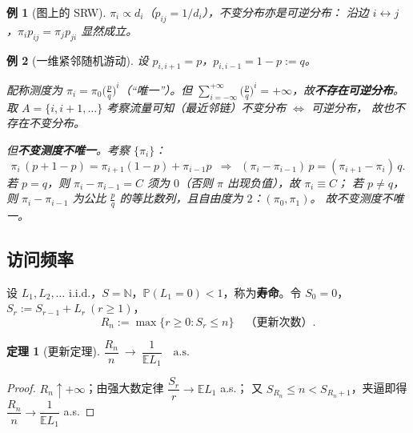 \documentclass[lang=cn,10pt,newtx,thmcnt=chapter,mode=simple]{vividbook}
\providecommand{\N}{}\renewcommand{\N}{\mathbb{N}}
\providecommand{\E}{}\renewcommand{\E}{\mathbb{E}}
\providecommand{\Pp}{}\renewcommand{\Pp}{\mathbb{P}}
\newcommand{\darr}{\;\Rightarrow\;}
\theoremstyle{vividthm}
\newtheorem*{vividtheorem}{定理}
\theoremstyle{vividdef}
\theoremstyle{vividexa}
\newtheorem*{vividexample}{例}
\theoremstyle{vividrem}
\renewenvironment{theorem}[1][]{\begin{vividtheorem}[#1]}{\end{vividtheorem}}
\newenvironment{example}[1][]{\begin{vividexample}[#1]}{\end{vividexample}}
\begin{document}
\begin{example}[图上的 SRW]
$\pi_i\propto d_i$（$p_{ij}=1/d_i$），不变分布亦是可逆分布：
沿边 $i\leftrightarrow j$，$\pi_ip_{ij}=\pi_jp_{ji}$ 显然成立。
\end{example}

\begin{example}[一维紧邻随机游动]
设 $p_{i,i+1}=p$，$p_{i,i-1}=1-p:=q$。

配称测度为 $\pi_i=\pi_0\bigl(\tfrac{p}{q}\bigr)^i$（“唯一”）。但
$\sum_{i=-\infty}^{+\infty}\bigl(\tfrac{p}{q}\bigr)^i=+\infty$，故\textbf{不存在可逆分布}。
取 $A=\{i,i+1,\dots\}$ 考察流量可知（最近邻链）不变分布 $\iff$ 可逆分布，
故也不存在不变分布。

但\textbf{不变测度不唯一}。考察 $\{\pi_i\}$：
\[
\pi_i\,(p+1-p)=\pi_{i+1}(1-p)+\pi_{i-1}p
\ \darr\ (\pi_i-\pi_{i-1})\,p=(\pi_{i+1}-\pi_i)\,q .
\]
若 $p=q$，则 $\pi_i-\pi_{i-1}=C$ 须为 $0$（否则 $\pi$ 出现负值），故 $\pi_i\equiv C$；
若 $p\ne q$，则 $\pi_i-\pi_{i-1}$ 为公比 $\tfrac{p}{q}$ 的等比数列，且自由度为 $2$：$(\pi_0,\pi_1)$。
故不变测度不唯一。
\end{example}

\subsection{访问频率}

设 $L_1,L_2,\dots$ i.i.d.，$S=\N$，$\Pp(L_1=0)<1$，称为\textbf{寿命}。令
$S_0=0$，$S_r:=S_{r-1}+L_r\ (r\ge1)$，
\[
R_n:=\max\{r\ge0:S_r\le n\}\quad\text{（更新次数）}.
\]

\begin{theorem}[更新定理]
$\dfrac{R_n}{n}\ \longrightarrow\ \dfrac{1}{\E L_1}\quad\text{a.s.}$
\end{theorem}

\begin{proof}
$R_n\uparrow+\infty$；由强大数定律 $\dfrac{S_r}{r}\to\E L_1$ a.s.；
又 $S_{R_n}\le n<S_{R_n+1}$，夹逼即得 $\dfrac{R_n}{n}\to\dfrac{1}{\E L_1}$ a.s.
\end{proof}
\end{document}
